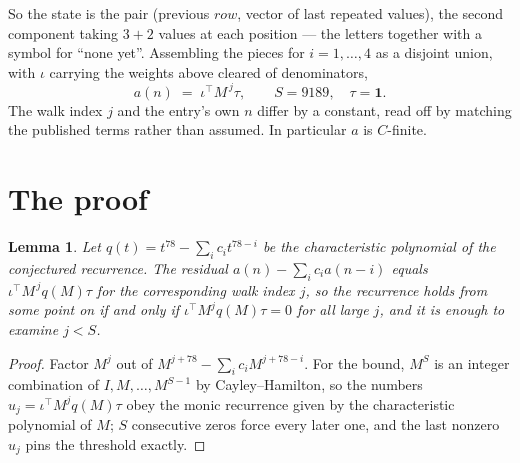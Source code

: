\documentclass[11pt,a4paper]{article}
\theoremstyle{plain}
\newtheorem{lemma}[theorem]{Lemma}
\theoremstyle{definition}
\begin{document}
So the state is the pair (previous $row$, vector of last repeated values), the second
component taking $3+2$ values at each position --- the letters together with a symbol for
``none yet''. Assembling the pieces for $i=1,\dots,4$ as a disjoint union, with $\iota$ carrying the weights above cleared of denominators,
\[
a(n)\;=\;\iota^{\!\top}M^{\,j}\tau ,\qquad S=9189,\quad\tau=\mathbf{1} .
\]
The walk index $j$ and the entry's own $n$ differ by a constant, read off by matching the
published terms rather than assumed. In particular $a$ is $C$-finite.

\section{The proof}

\begin{lemma}\label{lem:crit}
Let $q(t)=t^{78}-\sum_i c_it^{78-i}$ be the characteristic polynomial of the
conjectured recurrence. The residual $a(n)-\sum_ic_ia(n-i)$ equals
$\iota^{\!\top}M^{\,j}q(M)\tau$ for the corresponding walk index $j$, so the recurrence
holds from some point on if and only if $\iota^{\!\top}M^{j}q(M)\tau=0$ for all large $j$,
and it is enough to examine $j<S$.
\end{lemma}

\begin{proof}
Factor $M^{j}$ out of $M^{j+78}-\sum_ic_iM^{j+78-i}$. For the bound, $M^{S}$
is an integer combination of $I,M,\dots,M^{S-1}$ by Cayley--Hamilton, so the numbers
$u_j=\iota^{\!\top}M^{j}q(M)\tau$ obey the monic recurrence given by the characteristic
polynomial of $M$; $S$ consecutive zeros force every later one, and the last nonzero $u_j$
pins the threshold exactly.
\end{proof}
\end{document}
